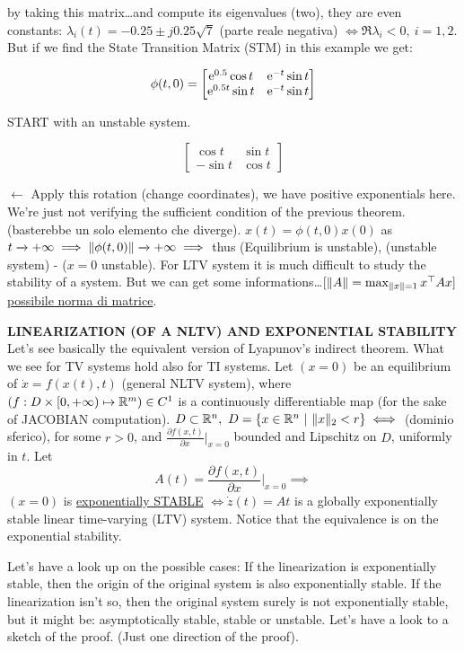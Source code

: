 by taking this matrix\dots and compute its eigenvalues (two), they are even constants: $\lambda_i(t) = -0.25 \pm j0.25\sqrt{7}$ (parte reale negativa) $\iff \Re{\lambda_i} < 0,\ i=1,2$. But if we find the State Transition Matrix (STM) in this example we get:

\[
	\phi(t,0) = \begin{bmatrix}
	\mathop{}\!\mathrm{e}^{0.5} \cos{t} & \mathop{}\!\mathrm{e}^{-t}\sin{t} \\
	\mathop{}\!\mathrm{e}^{0.5t}\sin{t} & \mathop{}\!\mathrm{e}^{-t}\sin{t} \end{bmatrix}
\]

START with an unstable system.

\[
	\begin{bmatrix} \cos{t} & \sin{t} \\
	-\sin{t} & \cos{t} \end{bmatrix}
\]

$\leftarrow$ Apply this rotation (change coordinates), we have positive exponentials here. We're just not verifying the sufficient condition of the previous theorem. (basterebbe un solo elemento che diverge).
$x(t) = \phi(t,0)x(0)$ as $t \tendsto{} +\infty \implies \norma{\phi(t,0)} \tendsto{} +\infty \implies$ thus (Equilibrium is unstable), (unstable system) - ($x=0$ unstable). For LTV system it is much difficult to study the stability of a system. But we can get some informations\dots $[\lVert A\rVert = \max_{\lVert x\rVert=1}{x^\top Ax}]$ \underline{possibile norma di matrice}.

\begin{thrm}{\textbf{LINEARIZATION (OF A NLTV) AND EXPONENTIAL STABILITY}} \newline
Let's see basically the equivalent version of Lyapunov's indirect theorem. What we see for TV systems hold also for TI systems.
Let $(x=0)$ be an equilibrium of $\dot{x}=f(x(t),t)$ (general NLTV system), where $(f:D \times [0,+\infty) \mapsto \mathbb{R}^m) \in C^1$ is a continuously differentiable map (for the sake of JACOBIAN computation).
$D \subset \mathbb{R}^n,\ D = \{x \in \mathbb{R}^n\ |\ \lVert x\rVert_2 < r\} \iff$ (dominio sferico), for some $r > 0$, and $\frac{\partial{f(x,t)}}{\partial{x}}|_{x=0}$ bounded and Lipschitz on $D$, uniformly in $t$. Let
\[	
	A(t) = \frac{\partial{f(x,t)}}{\partial{x}}|_{x=0} \implies
\]
$(x=0)$ is \underline{exponentially STABLE} $\iff \dot{z}(t) = At$ is a globally exponentially stable linear time-varying (LTV) system. Notice that the equivalence is on the exponential stability.
\end{thrm}

Let's have a look up on the possible cases: If the linearization is exponentially stable, then the origin of the original system is also exponentially stable. If the linearization isn't so, then the original system surely is not exponentially stable, but it might be: asymptotically stable, stable or unstable. Let's have a look to a sketch of the proof. (Just one direction of the proof).


